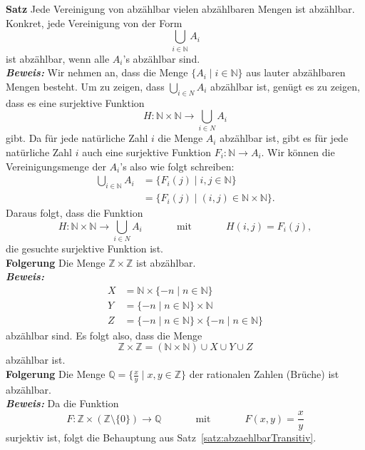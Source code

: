 \textbf{Satz }
Jede Vereinigung von abzählbar vielen abzählbaren Mengen ist abzählbar. Konkret, jede Vereinigung von der Form
\[
\bigcup_{i\in\mathbb{N}}A_i
\]
ist abzählbar, wenn alle $A_i$'s abzählbar sind. \\
\textbf{\textit{Beweis: }}
Wir nehmen an, dass die Menge $\{A_i\mid i\in \mathbb{N} \}$ aus lauter abzählbaren Mengen besteht. Um zu zeigen, dass $\bigcup_{i\in N}A_i$ abzählbar ist, genügt es zu zeigen, dass es eine surjektive Funktion
\[
H:\mathbb{N}\times\mathbb{N}\to\bigcup_{i\in N}A_i
\]
gibt. Da für jede natürliche Zahl $i$ die Menge $A_i$ abzählbar ist, gibt es für jede natürliche Zahl $i$ auch eine surjektive Funktion $F_i:\mathbb{N}\to A_i$. Wir können die Vereinigungsmenge der $A_i$'s also wie folgt schreiben:
\begin{align*}
\bigcup_{i\in \mathbb{N}}A_i&=\{F_i(j)\mid i,j\in\mathbb{N} \}\\
&=\{F_i(j)\mid (i,j)\in\mathbb{N}\times\mathbb{N} \}.
\end{align*}
Daraus folgt, dass die Funktion
\[
H:\mathbb{N}\times\mathbb{N}\to \bigcup_{i\in N}A_i\phantom{abstand}\text{mit}\phantom{abstand} H(i,j)=F_i(j),
\]
die gesuchte surjektive Funktion ist. \\
\textbf{Folgerung }
Die Menge $\mathbb{Z}\times \mathbb{Z}$ ist abzählbar. \\
\textbf{\textit{Beweis: }}
\begin{align*}
X&=\mathbb{N}\times\{-n\mid n\in \mathbb{N}\}\\
Y&=\{-n\mid n\in \mathbb{N}\}\times\mathbb{N} \\
Z&=\{-n\mid n\in \mathbb{N}\}\times\{-n\mid n\in \mathbb{N}\}
\end{align*}
abzählbar sind. Es folgt also, dass die Menge
\[
\mathbb{Z}\times\mathbb{Z}=(\mathbb{N}\times\mathbb{N})\cup X\cup Y\cup Z
\]
abzählbar ist. \\
\textbf{Folgerung }
Die Menge $\mathbb{Q}=\big\{\frac{x}{y}\mid x,y\in \mathbb{Z}\big\}$ der rationalen Zahlen (Brüche) ist abzählbar. \\
\textbf{\textit{Beweis: }}
Da die Funktion
\[
F:\mathbb{Z}\times(\mathbb{Z}\setminus{\{0\}})\to \mathbb{Q}\phantom{abstand}\text{mit}\phantom{abstand}F(x,y)=\frac{x}{y}
\]
surjektiv ist, folgt die Behauptung aus Satz~\ref{satz:abzaehlbarTransitiv}.\\


